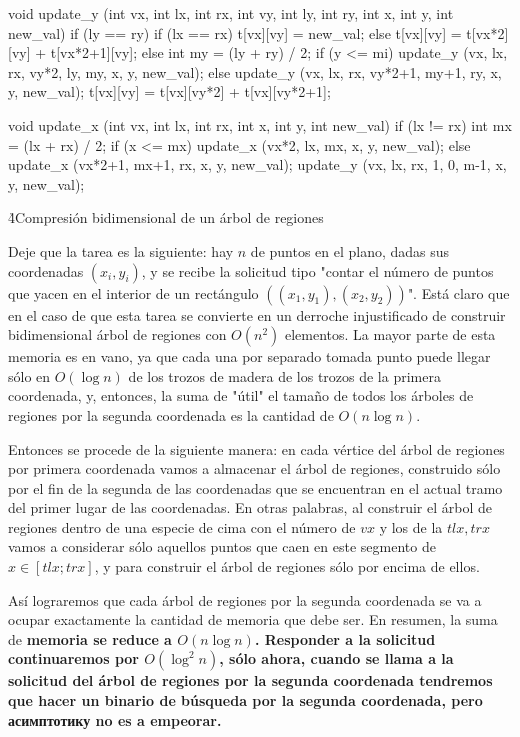 \code
void update_y (int vx, int lx, int rx, int vy, int ly, int ry, int x, int y, int new_val) {
if (ly == ry) {
if (lx == rx)
t[vx][vy] = new_val;
else
t[vx][vy] = t[vx*2][vy] + t[vx*2+1][vy];
}
else {
int my = (ly + ry) / 2;
if (y <= mi)
update_y (vx, lx, rx, vy*2, ly, my, x, y, new_val);
else
update_y (vx, lx, rx, vy*2+1, my+1, ry, x, y, new_val);
t[vx][vy] = t[vx][vy*2] + t[vx][vy*2+1];
}
}

void update_x (int vx, int lx, int rx, int x, int y, int new_val) {
if (lx != rx) {
int mx = (lx + rx) / 2;
if (x <= mx)
update_x (vx*2, lx, mx, x, y, new_val);
else
update_x (vx*2+1, mx+1, rx, x, y, new_val);
}
update_y (vx, lx, rx, 1, 0, m-1, x, y, new_val);
}
\endcode

\h4{Compresión bidimensional de un árbol de regiones}

Deje que la tarea es la siguiente: hay $n$ de puntos en el plano, dadas sus coordenadas $(x_i,y_i)$, y se recibe la solicitud tipo "contar el número de puntos que yacen en el interior de un rectángulo $((x_1,y_1),(x_2,y_2))$". Está claro que en el caso de que esta tarea se convierte en un derroche injustificado de construir bidimensional árbol de regiones con $O (n^2)$ elementos. La mayor parte de esta memoria es en vano, ya que cada una por separado tomada punto puede llegar sólo en $O (\log n)$ de los trozos de madera de los trozos de la primera coordenada, y, entonces, la suma de "útil" el tamaño de todos los árboles de regiones por la segunda coordenada es la cantidad de $O (n \log n)$.

Entonces se procede de la siguiente manera: en cada vértice del árbol de regiones por primera coordenada vamos a almacenar el árbol de regiones, construido sólo por el fin de la segunda de las coordenadas que se encuentran en el actual tramo del primer lugar de las coordenadas. En otras palabras, al construir el árbol de regiones dentro de una especie de cima con el número de $vx$ y los de la $tlx, trx$ vamos a considerar sólo aquellos puntos que caen en este segmento de $x \in [tlx; trx]$, y para construir el árbol de regiones sólo por encima de ellos.

Así lograremos que cada árbol de regiones por la segunda coordenada se va a ocupar exactamente la cantidad de memoria que debe ser. En resumen, la suma de \bf{memoria} se reduce a $O (n \log n)$. \bf{Responder a la solicitud} continuaremos por $O (\log^2 n)$, sólo ahora, cuando se llama a la solicitud del árbol de regiones por la segunda coordenada tendremos que hacer un binario de búsqueda por la segunda coordenada, pero асимптотику no es a empeorar.

